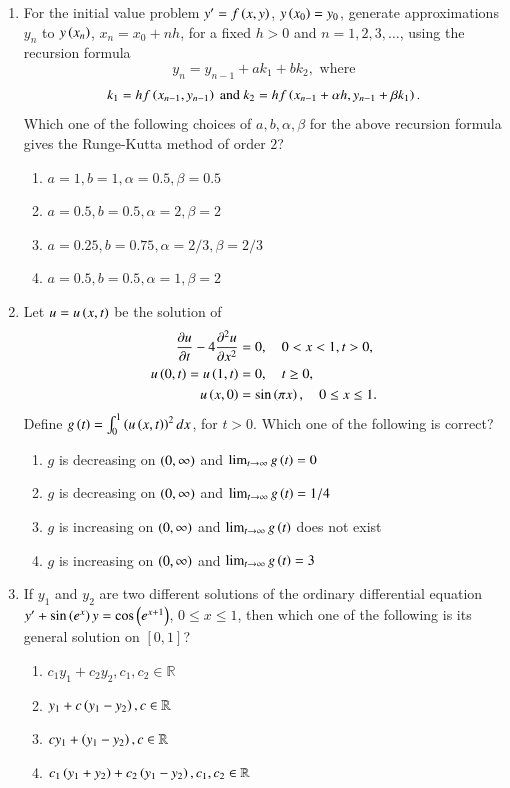 \documentclass[journal,12pt,onecolumn]{IEEEtran}
\theoremstyle{remark}
\begin{document}
\begin{enumerate}
\item For the initial value problem $y' = f\left(x, y\right)$, $y\left(x_0\right) = y_0$, generate approximations $y_n$ to $y\left(x_n\right)$, $x_n = x_0 + nh$, for a fixed $h > 0$ and $n = 1, 2, 3, \dots$, using the recursion formula
\[ y_n = y_{n-1} + ak_1 + bk_2, \text{ where} \]
\[ k_1 = hf\left(x_{n-1}, y_{n-1}\right) \text{ and } k_2 = hf\left(x_{n-1} + \alpha h, y_{n-1} + \beta k_1\right). \]
Which one of the following choices of $a, b, \alpha, \beta$ for the above recursion formula gives the Runge-Kutta method of order $2$? \hfill{}
\begin{enumerate}
    \item $a = 1, b = 1, \alpha = 0.5, \beta = 0.5$
    \item $a = 0.5, b = 0.5, \alpha = 2, \beta = 2$
    \item $a = 0.25, b = 0.75, \alpha = 2/3, \beta = 2/3$
    \item $a = 0.5, b = 0.5, \alpha = 1, \beta = 2$
\end{enumerate}

\item Let $u = u\left(x, t\right)$ be the solution of
\begin{align*}
    \frac{\partial u}{\partial t} - 4\frac{\partial^2 u}{\partial x^2} &= 0, \quad 0 < x < 1, t > 0, \\
    u\left(0, t\right) = u\left(1, t\right) &= 0, \quad t \ge 0, \\
    u\left(x, 0\right) &= \sin\left(\pi x\right), \quad 0 \le x \le 1.
\end{align*}
Define $g\left(t\right) = \int_0^1 \left(u\left(x, t\right)\right)^2 dx$, for $t > 0$. Which one of the following is correct? \hfill{}
\begin{enumerate}
    \item $g$ is decreasing on $\left(0, \infty\right)$ and $\lim_{t\to\infty} g\left(t\right) = 0$
    \item $g$ is decreasing on $\left(0, \infty\right)$ and $\lim_{t\to\infty} g\left(t\right) = 1/4$
    \item $g$ is increasing on $\left(0, \infty\right)$ and $\lim_{t\to\infty} g\left(t\right)$ does not exist
    \item $g$ is increasing on $\left(0, \infty\right)$ and $\lim_{t\to\infty} g\left(t\right) = 3$
\end{enumerate}

\item If $y_1$ and $y_2$ are two different solutions of the ordinary differential equation $y' + \sin\left(e^x\right)y = \cos\left(e^{x+1}\right)$, $0 \le x \le 1$, then which one of the following is its general solution on $[0, 1]$? \hfill{}
\begin{enumerate}
    \item $c_1 y_1 + c_2 y_2, c_1, c_2 \in \mathbb{R}$
    \item $y_1 + c\left(y_1 - y_2\right), c \in \mathbb{R}$
    \item $cy_1 + \left(y_1 - y_2\right), c \in \mathbb{R}$
    \item $c_1\left(y_1 + y_2\right) + c_2\left(y_1 - y_2\right), c_1, c_2 \in \mathbb{R}$
\end{enumerate}


\end{enumerate}
\end{document}
